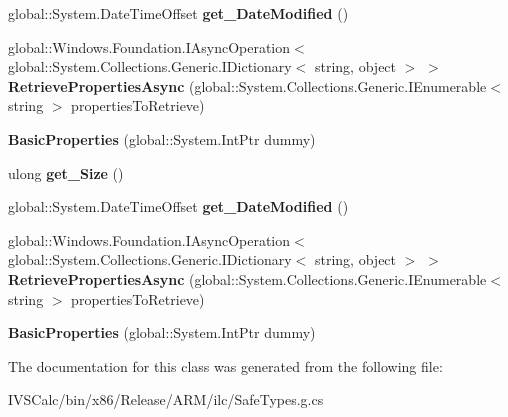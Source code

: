 \begin{DoxyCompactItemize}
global\+::\+System.\+Date\+Time\+Offset {\bfseries get\+\_\+\+Date\+Modified} ()
\item 
\mbox{\label{class_windows_1_1_storage_1_1_file_properties_1_1_basic_properties_a0e64ae79604ba053bcdbe1e537e3f2a7}} 
global\+::\+Windows.\+Foundation.\+I\+Async\+Operation$<$ global\+::\+System.\+Collections.\+Generic.\+I\+Dictionary$<$ string, object $>$ $>$ {\bfseries Retrieve\+Properties\+Async} (global\+::\+System.\+Collections.\+Generic.\+I\+Enumerable$<$ string $>$ properties\+To\+Retrieve)
\item 
\mbox{\label{class_windows_1_1_storage_1_1_file_properties_1_1_basic_properties_a1e59bb5e98b3bdb808833a68eab07f9e}} 
{\bfseries Basic\+Properties} (global\+::\+System.\+Int\+Ptr dummy)
\item 
\mbox{\label{class_windows_1_1_storage_1_1_file_properties_1_1_basic_properties_a990d0f7166669cc5c3a28b4c051a5f29}} 
ulong {\bfseries get\+\_\+\+Size} ()
\item 
\mbox{\label{class_windows_1_1_storage_1_1_file_properties_1_1_basic_properties_a32ef3325f757258938c74274c8d9a2ad}} 
global\+::\+System.\+Date\+Time\+Offset {\bfseries get\+\_\+\+Date\+Modified} ()
\item 
\mbox{\label{class_windows_1_1_storage_1_1_file_properties_1_1_basic_properties_a0e64ae79604ba053bcdbe1e537e3f2a7}} 
global\+::\+Windows.\+Foundation.\+I\+Async\+Operation$<$ global\+::\+System.\+Collections.\+Generic.\+I\+Dictionary$<$ string, object $>$ $>$ {\bfseries Retrieve\+Properties\+Async} (global\+::\+System.\+Collections.\+Generic.\+I\+Enumerable$<$ string $>$ properties\+To\+Retrieve)
\item 
\mbox{\label{class_windows_1_1_storage_1_1_file_properties_1_1_basic_properties_a1e59bb5e98b3bdb808833a68eab07f9e}} 
{\bfseries Basic\+Properties} (global\+::\+System.\+Int\+Ptr dummy)
\end{DoxyCompactItemize}


The documentation for this class was generated from the following file\+:\begin{DoxyCompactItemize}
\item 
I\+V\+S\+Calc/bin/x86/\+Release/\+A\+R\+M/ilc/Safe\+Types.\+g.\+cs\end{DoxyCompactItemize}
